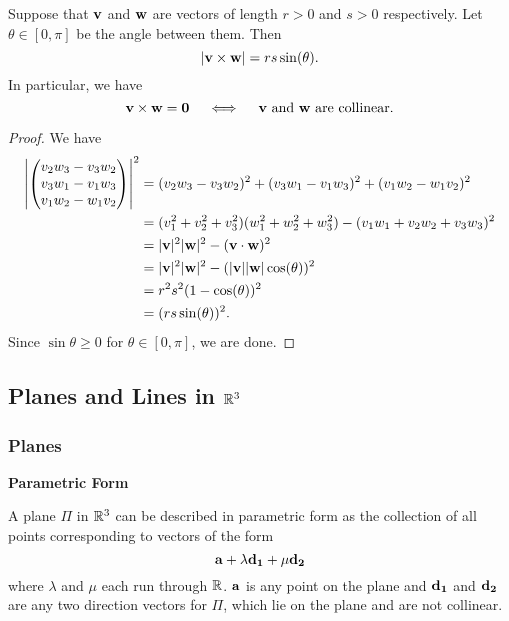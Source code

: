 \documentclass[10pt, a4paper]{article}
\begin{document}
\begin{lemma}
    Suppose that $\mathbf{v}$ and $\mathbf{w}$ are vectors of length $r > 0$ and $s > 0$ respectively. Let $\theta \in [0, \pi]$ be the angle between them. Then
    \[
    |\mathbf{v \times w}| = rs\sin(\theta).
    \]
    In particular, we have
    \[
    \mathbf{v \times w = 0}\quad\iff\quad\mathbf{v}\text{ and }\mathbf{w}\text{ are collinear}.
    \]

    \begin{proof}
        We have
        \begin{align*}
            \left|\begin{pmatrix}
                v_2 w_3 - v_3 w_2 \\
                v_3 w_1 - v_1 w_3 \\
                v_1 w_2 - w_1 v_2
            \end{pmatrix}\right| ^ 2
            &= (v_2w_3 - v_3w_2) ^ 2 + (v_3w_1 - v_1w_3) ^ 2 + (v_1w_2 - w_1v_2) ^ 2 \\
            &= (v_1 ^ 2 + v_2 ^ 2 + v_3 ^ 2)(w_1 ^ 2 + w_2 ^ 2 + w_3 ^ 2) - (v_1w_1 + v_2w_2 + v_3w_3) ^ 2 \\
            &= |\mathbf{v}| ^ 2 |\mathbf{w}| ^ 2 - (\mathbf{v \cdot w}) ^ 2 \\
            &= |\mathbf{v}| ^ 2 |\mathbf{w}| ^ 2 - (|\mathbf{v}||\mathbf{w}|\cos(\theta)) ^ 2 \\
            &= r^2s^2(1 - \cos(\theta)) ^ 2 \\
            &= (rs\sin(\theta)) ^ 2.
        \end{align*}
        Since $\sin\theta \geq 0$ for $\theta \in [0, \pi]$, we are done.
    \end{proof}
\end{lemma}

\subsection{Planes and Lines in $\mathbb{R} ^ 3$}
\subsubsection{Planes}

\textbf{Parametric Form}

A plane $\Pi$ in $\mathbb{R} ^ 3$ can be described in parametric form as the collection of all points corresponding to vectors of the form
\[
\mathbf{a} + \lambda\mathbf{d_1} + \mu\mathbf{d_2}
\]
where $\lambda$ and $\mu$ each run through $\mathbb{R}$. $\mathbf{a}$ is any point on the plane and $\mathbf{d_1}$ and $\mathbf{d_2}$ are any two direction vectors for $\Pi$, which lie on the plane and are not collinear.
\end{document}
